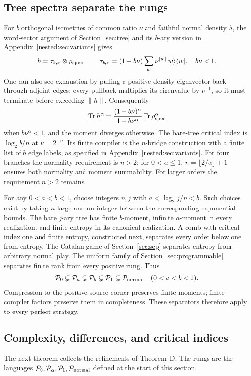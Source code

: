 \subsection{Tree spectra separate the rungs}
For $b$ orthogonal isometries of common ratio $\nu$ and faithful normal
density $h$, the word-sector argument of Section~\ref{sec:tree} and its $b$-ary version in Appendix~\ref{nested:sec:variants} gives
\[
 h=\tau_{b,\nu}\otimes\rho_{\rm spec},\qquad
 \tau_{b,\nu}=(1-b\nu)\sum_w\nu^{|w|}|w\rangle\langle w|,
 \quad b\nu<1.
\]
One can also see exhaustion by pulling a positive density eigenvector
back through adjoint edges: every pullback multiplies its eigenvalue
by $\nu^{-1}$, so it must terminate before exceeding $\|h\|$.
Consequently
\begin{equation}\label{eq:momenttree}
 \operatorname{Tr} h^\alpha=
 \frac{(1-b\nu)^\alpha}{1-b\nu^\alpha}\operatorname{Tr}\rho_{\rm spec}^\alpha
\end{equation}
when $b\nu^\alpha<1$, and the moment diverges otherwise. The bare-tree
critical index is $\log_2b/n$ at $\nu=2^{-n}$. Its finite compiler is
the $n$-bridge construction with a finite list of $b$ edge labels, as
specified in Appendix~\ref{nested:sec:variants}. For four branches the
normality requirement is $n>2$; for $0<\alpha\le1$,
$n=\lfloor2/\alpha\rfloor+1$ ensures both normality and moment
summability. For larger orders the requirement $n>2$ remains.

For any $0<a<b<1$, choose integers $n,j$ with
$a<\log_2j/n<b$. Such choices exist by taking $n$ large and an integer
between the corresponding exponential bounds. The bare $j$-ary tree
has finite $b$-moment, infinite $a$-moment in every realization, and
finite entropy in its canonical realization. A comb with critical
index one and finite entropy, constructed next, separates every order
below one from entropy. The Catalan game of Section~\ref{sec:sep}
separates entropy from arbitrary normal play. The uniform family of
Section~\ref{sec:programmable} separates finite rank from every
positive rung. Thus
\begin{equation}\label{eq:strictladder}
 \mathcal P_0\subsetneq\mathcal P_a\subsetneq\mathcal P_b
 \subsetneq\mathcal P_1\subsetneq\mathcal P_{\rm normal}
 \quad(0<a<b<1).
\end{equation}
Compression to the positive source corner preserves finite moments;
finite compiler factors preserve them in completeness. These separators
therefore apply to every perfect strategy.

\subsection{Complexity, differences, and critical indices}
The next theorem collects the refinements of Theorem~D. The rungs are
the languages $\mathcal P_0,\mathcal P_\alpha,\mathcal P_1,\mathcal P_{\rm normal}$
defined at the start of this section.

